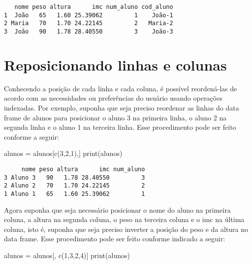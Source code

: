 \documentclass[
  letterpaper,
  DIV=11,
  numbers=noendperiod]{scrreprt}
\newenvironment{Shaded}{\begin{snugshade}}{\end{snugshade}}
\newcommand{\DecValTok}[1]{\textcolor[rgb]{0.68,0.00,0.00}{#1}}
\newcommand{\FunctionTok}[1]{\textcolor[rgb]{0.28,0.35,0.67}{#1}}
\newcommand{\NormalTok}[1]{\textcolor[rgb]{0.00,0.23,0.31}{#1}}
\newcommand{\OtherTok}[1]{\textcolor[rgb]{0.00,0.23,0.31}{#1}}
\begin{document}
\begin{verbatim}
   nome peso altura      imc num_aluno cod_aluno
1  João   65   1.60 25.39062         1    João-1
2 Maria   70   1.70 24.22145         2   Maria-2
3  João   90   1.78 28.40550         3    João-3
\end{verbatim}

\section{Reposicionando linhas e
colunas}\label{reposicionando-linhas-e-colunas}

Conhecendo a posição de cada linha e cada coluna, é possível
reordená-las de acordo com as necessidades ou preferências do usuário
usando operações indexadas. Por exemplo, suponha que seja preciso
reordenar as linhas do data frame de alunos para posicionar o aluno 3 na
primeira linha, o aluno 2 na segunda linha e o aluno 1 na terceira
linha. Esse procedimento pode ser feito conforme a seguir:

\begin{Shaded}
\begin{Highlighting}[]
\NormalTok{alunos }\OtherTok{=}\NormalTok{ alunos[}\FunctionTok{c}\NormalTok{(}\DecValTok{3}\NormalTok{,}\DecValTok{2}\NormalTok{,}\DecValTok{1}\NormalTok{),]}
\FunctionTok{print}\NormalTok{(alunos)}
\end{Highlighting}
\end{Shaded}

\begin{verbatim}
     nome peso altura      imc num_aluno
3 Aluno 3   90   1.78 28.40550         3
2 Aluno 2   70   1.70 24.22145         2
1 Aluno 1   65   1.60 25.39062         1
\end{verbatim}

Agora suponha que seja necessário posicionar o nome do aluno na primeira
coluna, a altura na segunda coluna, o peso na terceira coluna e o imc na
última coluna, isto é, suponha que seja preciso inverter a posição do
peso e da altura no data frame. Esse procedimento pode ser feito
conforme indicado a seguir:

\begin{Shaded}
\begin{Highlighting}[]
\NormalTok{alunos }\OtherTok{=}\NormalTok{ alunos[, }\FunctionTok{c}\NormalTok{(}\DecValTok{1}\NormalTok{,}\DecValTok{3}\NormalTok{,}\DecValTok{2}\NormalTok{,}\DecValTok{4}\NormalTok{)]}
\FunctionTok{print}\NormalTok{(alunos)}
\end{Highlighting}
\end{Shaded}
\end{document}
